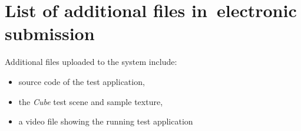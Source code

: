 \chapter{List of additional files in~electronic submission}

Additional files uploaded to the system include:
\begin{itemize}
\item source code of the test application,
\item the \textit{Cube} test scene and sample texture,
\item a video file showing the running test application
\end{itemize}
